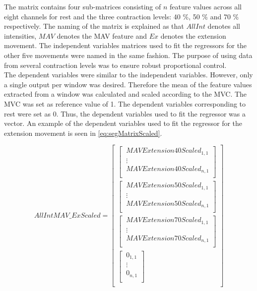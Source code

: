 The matrix contains four sub-matrices consisting of $n$ feature values across all eight channels for rest and the three contraction levels: 40 \%, 50 \% and 70 \% respectively. The naming of the matrix is explained as that $AllInt$ denotes all intensities, $MAV$ denotes the MAV feature and $Ex$ denotes the extension movement. The independent variables matrices used to fit the regressors for the other five movements were named in the same fashion. The purpose of using data from several contraction levels was to ensure robust proportional control. \\ 
The dependent variables were similar to the independent variables. However, only a single output per window was desired. Therefore the mean of the feature values extracted from a window was calculated and scaled according to the MVC. The MVC was set as reference value of 1. The dependent variables corresponding to rest were set as 0. Thus, the dependent variables used to fit the regressor was a vector. An example of the dependent variables used to fit the regressor for the extension movement is seen in \eqref{eq:segMatrixScaled}.

\begin{equation} \label{eq:segMatrixScaled}
AllIntMAV\_ExScaled=\begin{bmatrix} 
\begin{bmatrix}
\ MAVExtension40Scaled_{1,1} \\ 
\ \vdots \\
\ MAVExtension40Scaled_{n,1}\\ \end{bmatrix} \\
\begin{bmatrix} 
\ MAVExtension50Scaled_{1,1} \\
\ \vdots \\
\ MAVExtension50Scaled_{n,1} \\ \end{bmatrix} \\
\begin{bmatrix} 
\ MAVExtension70Scaled_{1,1} \\
\ \vdots \\
\ MAVExtension70Scaled_{n,1}\\ \end{bmatrix} \\
\begin{bmatrix}
\ 0_{1,1} \\ 
\ \vdots \\
\ 0_{n,1}\\ \end{bmatrix} \\
\end{bmatrix}
\end{equation}

